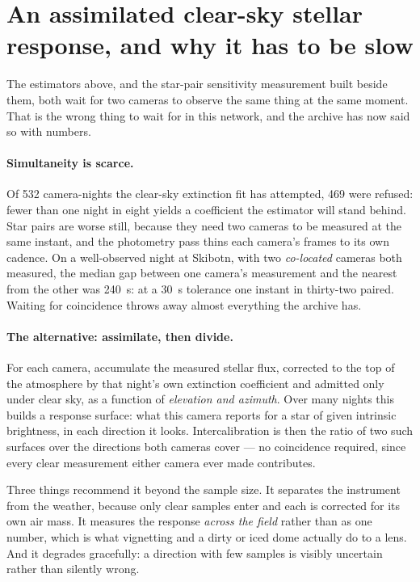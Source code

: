 \documentclass[11pt,a4paper]{article}
\begin{document}
\section{An assimilated clear-sky stellar response, and why it has to be slow}
\label{sec:assimilated}

The estimators above, and the star-pair sensitivity measurement built beside
them, both wait for two cameras to observe the same thing at the same moment.
That is the wrong thing to wait for in this network, and the archive has now
said so with numbers.

\paragraph{Simultaneity is scarce.} Of \num{532} camera-nights the clear-sky
extinction fit has attempted, \num{469} were refused: fewer than one night in
eight yields a coefficient the estimator will stand behind. Star pairs are worse
still, because they need two cameras to be measured at the same instant, and the
photometry pass thins each camera's frames to its own cadence. On a
well-observed night at Skibotn, with two \emph{co-located} cameras both
measured, the median gap between one camera's measurement and the nearest from
the other was \SI{240}{\second}: at a \SI{30}{\second} tolerance one instant
in thirty-two paired. Waiting for coincidence throws away almost everything the
archive has.

\paragraph{The alternative: assimilate, then divide.} For each camera,
accumulate the measured stellar flux, corrected to the top of the atmosphere by
that night's own extinction coefficient and admitted only under clear sky, as a
function of \emph{elevation and azimuth}. Over many nights this builds a
response surface: what this camera reports for a star of given intrinsic
brightness, in each direction it looks. Intercalibration is then the ratio of
two such surfaces over the directions both cameras cover --- no coincidence
required, since every clear measurement either camera ever made contributes.

Three things recommend it beyond the sample size. It separates the instrument
from the weather, because only clear samples enter and each is corrected for
its own air mass. It measures the response \emph{across the field} rather than
as one number, which is what vignetting and a dirty or iced dome actually do to
a lens. And it degrades gracefully: a direction with few samples is visibly
uncertain rather than silently wrong.
\end{document}
